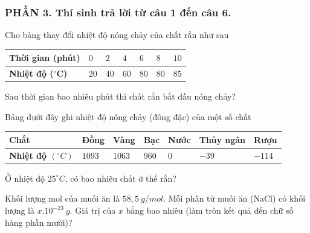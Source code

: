 \subsubsection*{PHẦN 3. Thí sinh trả lời từ câu 1 đến câu 6.}
\setcounter{ex}{0}
\begin{ex}%
	Cho bảng thay đổi nhiệt độ nóng chảy của chất rắn như sau
	\begin{center}
		
		
		\begin{tabular}{|>{\raggedright\arraybackslash}m{4cm}|
				>{\centering\arraybackslash}m{1cm}|
				>{\centering\arraybackslash}m{1cm}|
				>{\centering\arraybackslash}m{1cm}|
				>{\centering\arraybackslash}m{1cm}|
				>{\centering\arraybackslash}m{1cm}|
				>{\centering\arraybackslash}m{1cm}|}
			\hline
			\textbf{Thời gian (phút)} & $0$ & $2$ & $4$ & $6$ & $8$ & $10$ \\
			\hline
			\textbf{Nhiệt độ ($^\circ$C)} & $20$ & $40$ & $60$ & $80$ & $80$ & $85$ \\
			\hline
		\end{tabular}
	\end{center}
	Sau thời gian bao nhiêu phút thì chất rắn bắt đầu nóng chảy?
	\loigiai{}
\end{ex}

\begin{ex}%
	Bảng dưới đây ghi nhiệt độ nóng chảy (đông đặc) của một số chất
	\begin{center}
	\begin{tabular}
		{|>{\raggedright\arraybackslash}m{3cm}|
			>{\centering\arraybackslash}m{2cm}|
			>{\centering\arraybackslash}m{2cm}|
			>{\centering\arraybackslash}m{2cm}|
			>{\centering\arraybackslash}m{2cm}|
			>{\centering\arraybackslash}m{2cm}|
			>{\centering\arraybackslash}m{2cm}|}
		\hline
		\textbf{Chất}	& Đồng & Vàng & Bạc & Nước & Thủy ngân & Rượu \\
		\hline
		\textbf{Nhiệt độ $(^\circ C)$}	& $1093$ & $1063$ & $960$ & $0$ & $-39$ & $-114$ \\
		\hline
	\end{tabular}
	
	\end{center}
	Ở nhiệt độ $25^\circ C$, có bao nhiêu chất ở thể rắn?
	\loigiai{}
\end{ex}

\begin{ex}%
	Khối lượng mol của muối ăn là $58,5\ g/mol$. Mỗi phân tử muối ăn (NaCl) có khối lượng là $x.10^{-23}\ g$. Giá trị của $x$ bằng bao nhiêu (làm tròn kết quả đến chữ số hàng phần mười)?
	
\end{ex}

